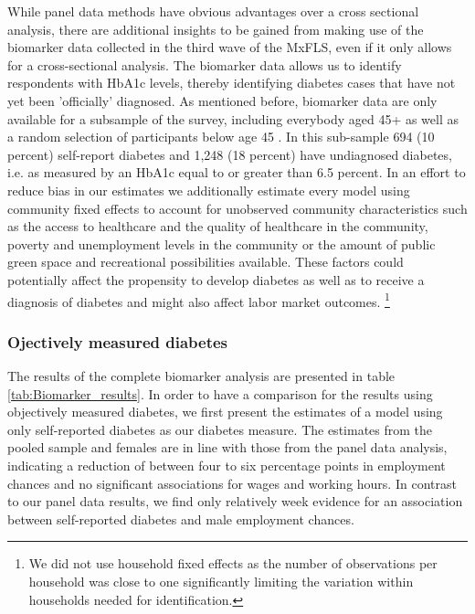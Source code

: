 \documentclass[12pt,english,british]{article}
\begin{document}
While panel data methods have obvious advantages over a cross sectional
analysis, there are additional insights
to be gained from making use of the biomarker data collected in the
third wave of the \ac{MxFLS}, even if it only allows for a cross-sectional
analysis. The biomarker data allows us to identify respondents with
\ac{HbA1c} levels, thereby identifying diabetes cases that have
not yet been 'officially' diagnosed. As mentioned before, biomarker
data are only available for a subsample of the survey, including everybody
aged 45+ as well as a random selection of participants below age 45
\citep{Crimmins2015}. In this sub-sample 694 (10 percent) self-report
diabetes and 1,248 (18 percent) have undiagnosed diabetes, i.e. as
measured by an \ac{HbA1c} equal to or greater than 6.5 percent. In an effort to reduce bias in our estimates we additionally estimate every model using community fixed effects to account for unobserved community characteristics such as the access to healthcare and the quality of healthcare in the community, poverty and unemployment levels in the community or the amount of public green space and recreational possibilities available. These factors could potentially affect the propensity to develop diabetes as well as to receive a diagnosis of diabetes and might also affect labor market outcomes.  \footnote{We did not use household fixed effects as the number of observations per household was close to one significantly limiting the variation within households needed for identification.}


\subsubsection*{Ojectively measured diabetes}


The results of the complete biomarker analysis are presented in table \ref{tab:Biomarker_results}. In order to have a comparison for the results using objectively measured
diabetes, we first present the estimates of a model using only self-reported diabetes as our diabetes measure. The estimates from the pooled sample and females
are in line with those from the panel data analysis, indicating a reduction
of between four to six percentage points in employment chances and no significant associations
for wages and working hours. In contrast to our panel data results,
we find only relatively week evidence for an association between self-reported diabetes and male
employment chances.
\end{document}
